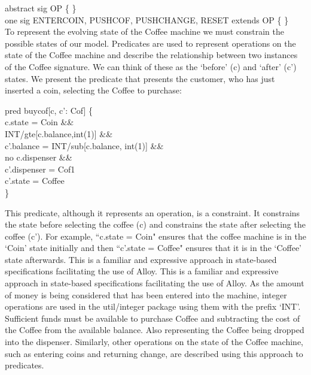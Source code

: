 \documentclass[a4paper,12pt]{extarticle}
\begin{document}
abstract sig OP \{ \}\\
one sig ENTERCOIN, PUSHCOF, PUSHCHANGE, RESET extends OP \{ \}\\

To represent the evolving state of the Coffee machine we must constrain the possible states of our model. Predicates are used to represent operations on the state of the Coffee machine and describe the relationship between two instances of the Coffee signature. We can think of these as the `before' (c) and `after' (c') states. We present the predicate that presents the customer, who has just inserted a coin, selecting the Coffee to purchase:\\
\begin{algorithm}

pred buycof[c, c': Cof] \{ \\

c.state = Coin \&\& \\
INT/gte[c.balance,int(1)] \&\& \\
c'.balance = INT/sub[c.balance, int(1)] \&\& \\
no c.dispenser \&\& \\
c'.dispenser = Cof1\\
c'.state = Coffee\\

\}\\
\end{algorithm}


This predicate, although it represents an operation, is a constraint. It constrains the state before selecting the coffee (c) and constrains the state after selecting the coffee (c'). For example, ``c.state = Coin" ensures that the coffee machine is in the `Coin’ state initially and then ``c'.state = Coffee" ensures that it is in the `Coffee' state afterwards. This is a familiar and expressive approach in state-based specifications facilitating the use of Alloy. This is a familiar and expressive approach in state-based specifications facilitating the use of Alloy. As the amount of money is being considered that has been entered into the machine, integer operations are used in the util/integer package using them with the prefix `INT’. Sufficient funds must be available to purchase Coffee and subtracting the cost of the Coffee from the available balance. Also representing the Coffee being dropped into the dispenser. Similarly, other operations on the state of the Coffee machine, such as entering coins and returning change, are described using this approach to predicates.\\
\end{document}

